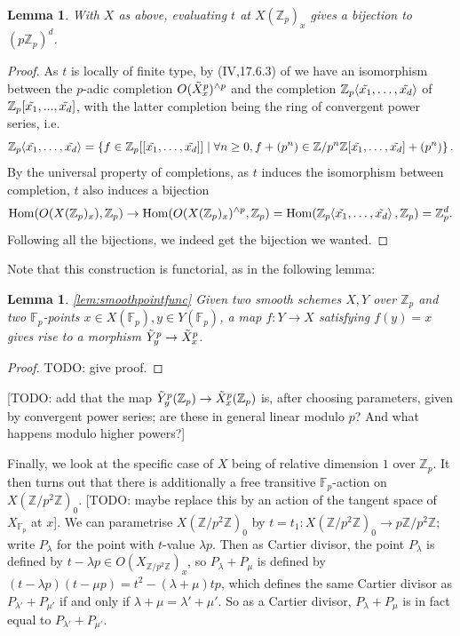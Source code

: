 \documentclass[12pt]{article}
\newcommand{\Z}{\mathbb{Z}}
\newcommand{\F}{\mathbb{F}}
\renewcommand{\angle}[1]{\hspace{-2pt}\left\langle #1 \right\rangle}
\DeclareMathOperator{\Hom}{Hom}
\theoremstyle{plain}
\newtheorem{lem}[thm]{Lemma} %
\theoremstyle{definition}
\theoremstyle{remark}
\begin{document}
\begin{lem}
With $X$ as above, evaluating $t$ at $X(\Z_p)_x$ gives a bijection to $(p\Z_p)^d$.
\end{lem}
\begin{proof}
As $t$ is locally of finite type, by (IV,17.6.3) of \cite{ega} we have an isomorphism between the $p$-adic completion $O(\Tilde{X}_x^p)^{\wedge p}$ and the completion $\Z_p\angle{\Tilde{x_1},\dots, \Tilde{x_d}}$ of $\Z_p[\Tilde{x_1},...,\Tilde{x_d}]$, with the latter completion being the ring of convergent power series, i.e.
\[
\Z_p\angle{\Tilde{x_1},\dots, \Tilde{x_d}} = \left\{f \in \Z_p[[\Tilde{x_1},\dots,\Tilde{x_d}]] \mid \forall n \geq 0, f + (p^n) \in \Z/p^n\Z[\Tilde{x_1},\dots,\tilde{x_d}] + (p^n) \right\}.
\]
By the universal property of completions, as $t$ induces the isomorphism between completion, $t$ also induces a bijection $$\Hom(O(X(\Z_p)_x), \Z_p) \to \Hom(O(X(\Z_p)_x)^{\wedge p}, \Z_p) = \Hom(\Z_p\angle{\Tilde{x_1},\dots,\Tilde{x_d}},\Z_p) = \Z_p^d.$$ Following all the bijections, we indeed get the bijection we wanted.
\end{proof}

Note that this construction is functorial, as in the following lemma:
\begin{lem}
\ref{lem:smoothpointfunc}
Given two smooth schemes $X,Y$ over $\Z_p$ and two $\F_p$-points $x\in X(\F_p), y\in Y(\F_p)$, a map $f: Y \to X$ satisfying $f(y) = x$ gives rise to a morphism $\Tilde{Y}_y^p \to \Tilde{X}_x^p$.
\end{lem}
\begin{proof}
TODO: give proof.
\end{proof}

[TODO: add that the map $\Tilde{Y}_y^p(\Z_p) \to \Tilde{X}_x^p(\Z_p)$ is, after choosing parameters, given by convergent power series; are these in general linear modulo $p$? And what happens modulo higher powers?]

Finally, we look at the specific case of $X$ being of relative dimension $1$ over $\Z_p$. It then turns out that there is additionally a free transitive $\F_p$-action on $X(\Z/p^2\Z)_0$. [TODO: maybe replace this by an action of the tangent space of $X_{\F_p}$ at $x$]. We can parametrise $X(\Z/p^2\Z)_0$ by $t = t_1 : X(\Z/p^2\Z)_0 \to p\Z/p^2\Z$; write $P_{\lambda}$ for the point with $t$-value $\lambda p$. Then as Cartier divisor, the point $P_{\lambda}$ is defined by $t - \lambda p \in O(X_{\Z/p^2\Z})_x$, so $P_{\lambda} + P_{\mu}$ is defined by $(t-\lambda p)(t-\mu p) = t^2 - (\lambda + \mu)tp$, which defines the same Cartier divisor as $P_{\lambda'} + P_{\mu'}$ if and only if $\lambda + \mu = \lambda' + \mu'$. So as a Cartier divisor, $P_{\lambda} + P_{\mu}$ is in fact equal to $P_{\lambda'} + P_{\mu'}$.
\end{document}
